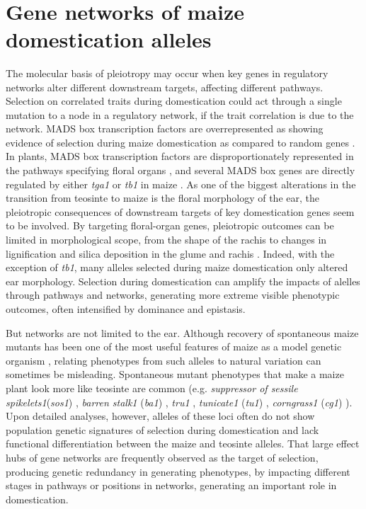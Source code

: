 \documentclass[9pt,twocolumn,twoside]{rilabRxiv}
\begin{document}
﻿\section*{Gene networks of maize domestication alleles}



﻿The molecular basis of pleiotropy may occur when key genes in regulatory networks alter different downstream targets, affecting different pathways.
Selection on correlated traits during domestication could act through a single mutation to a node in a regulatory network, if the trait correlation is due to the network.
 MADS box transcription factors are overrepresented as showing evidence of selection during maize domestication as compared to random genes \citep{zhao2011}.
In plants, MADS box transcription factors are disproportionately represented in the pathways specifying floral organs \citep{theissen2001}, and several MADS box genes are directly regulated by either \textit{tga1} or \textit{tb1} in maize \citep{wang2015, studer2017}.
As one of the biggest alterations in the transition from teosinte to maize is the floral morphology of the ear, the pleiotropic consequences of downstream targets of key domestication genes seem to be involved.
By targeting floral-organ genes, pleiotropic outcomes can be limited in morphological scope, from the shape of the rachis to changes in lignification and silica deposition in the glume and rachis \citep{doebley1996, dorweiler1997}.
Indeed, with the exception of \textit{tb1}, many alleles selected during maize domestication only altered ear morphology.
Selection during domestication can amplify the impacts of alelles through pathways and networks, generating more extreme visible phenotypic outcomes, often intensified by dominance and epistasis.

﻿But networks are not limited to the ear.
﻿Although recovery of spontaneous maize mutants has been one of the most useful features of maize as a model genetic organism \citep{strable2009, nannas2015}, relating phenotypes from such alleles to natural variation can sometimes be misleading.
Spontaneous mutant phenotypes that make a maize plant look more like teosinte are common (e.g. \textit{suppressor of sessile spikelets1}(\textit{sos1}) \citep{doebley1995sos1}, \textit{barren stalk1} (\textit{ba1}) \citep{gallavotti2004}, \textit{tru1} \citep{dong2017}, \textit{tunicate1} (\textit{tu1}) \citep{wingen2012}, \textit{corngrass1} (\textit{cg1}) \citep{chuck2007}).
Upon detailed analyses, however, alleles of these loci often do not show population genetic signatures of selection during domestication and lack functional differentiation between the maize and teosinte alleles.
That large effect hubs of gene networks are frequently observed as the target of selection, producing genetic redundancy in generating phenotypes,  by impacting different stages in pathways or positions in networks, generating an important role in domestication. %
\end{document}
